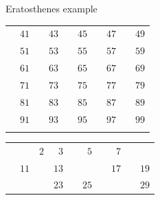 \documentclass{beamer}
\begin{document}
\begin{frame}[plain]{Eratosthenes example}
{\begin{tabular}{r r r r r r r r r r}
			                   & \color{black} $41$ &                    & \color{black} $43$ &                    & \color{  red} $45$ &                    & \color{black} $47$ &                    & \color{black} $49$\\
			                   & \color{  red} $51$ &                    & \color{black} $53$ &                    & \color{black} $55$ &                    & \color{  red} $57$ &                    & \color{black} $59$\\
			                   & \color{black} $61$ &                    & \color{  red} $63$ &                    & \color{black} $65$ &                    & \color{black} $67$ &                    & \color{  red} $69$\\
			                   & \color{black} $71$ &                    & \color{black} $73$ &                    & \color{  red} $75$ &                    & \color{black} $77$ &                    & \color{black} $79$\\
			                   & \color{  red} $81$ &                    & \color{black} $83$ &                    & \color{black} $85$ &                    & \color{  red} $87$ &                    & \color{black} $89$\\
			                   & \color{black} $91$ &                    & \color{  red} $93$ &                    & \color{black} $95$ &                    & \color{black} $97$ &                    & \color{  red} $99$\\
			\phantom{$888$} & \phantom{$888$} & \phantom{$888$} & \phantom{$888$} & \phantom{$888$} & \phantom{$888$} & \phantom{$888$} & \phantom{$888$} & \phantom{$888$} & \phantom{$888$}
        \end{tabular}
	}
	 {
		\begin{tabular}{r r r r r r r r r r}
			                   &                    & \color{black}  $2$ & \color{ blue}  $3$ &                    & \color{black}  $5$ &                    & \color{black}  $7$ &                    &                   \\
			                   & \color{black} $11$ &                    & \color{black} $13$ &                    &                    &                    & \color{black} $17$ &                    & \color{black} $19$\\
			                   &                    &                    & \color{black} $23$ &                    & \color{black} $25$ &                    &                    &                    & \color{black} $29$\\

\end{tabular}}
\end{frame}
\end{document}
